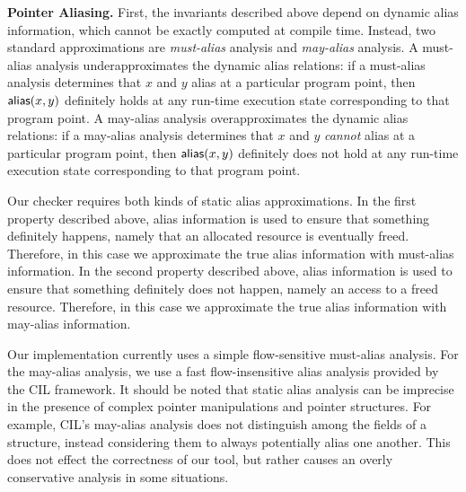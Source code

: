 \smallskip\noindent
{\bf Pointer Aliasing.}
First, the invariants described above depend on dynamic alias
information, which cannot be exactly computed at compile time.
Instead, two standard approximations are {\em must-alias} analysis and
{\em may-alias} analysis.  A must-alias analysis underapproximates the
dynamic alias relations:  if a must-alias analysis determines that $x$
and $y$ alias at a particular program point, then ${\mathsf{alias}}(x,y)$
definitely holds at any run-time execution state corresponding to that
program point.  A may-alias analysis overapproximates the dynamic
alias relations:  if a may-alias analysis determines that $x$ and $y$
{\em cannot} alias at a particular program point, then ${\mathsf{alias}}(x,y)$
definitely does not hold at any run-time execution state corresponding
to that program point.

Our checker requires both kinds of static alias approximations.  In
the first property described above, alias information is used to
ensure that something definitely happens, namely that an allocated
resource is eventually freed.  Therefore, in this case we approximate
the true alias information with must-alias information.  In the second
property described above, alias information is used to ensure that
something definitely does not happen, namely an access to a freed
resource.  Therefore, in this case we approximate the true alias
information with may-alias information.

Our implementation currently uses a simple flow-sensitive must-alias
analysis.  For the may-alias analysis, we use a fast flow-insensitive
alias analysis provided by the CIL framework.  It should be noted that 
static alias analysis
can be imprecise in the presence of complex pointer
manipulations and pointer structures.  For example, CIL's may-alias
analysis does not distinguish among the fields of a structure, instead
considering them to always potentially alias one another.  This does not
effect the correctness of our tool, but rather causes an overly 
conservative analysis in some situations.

